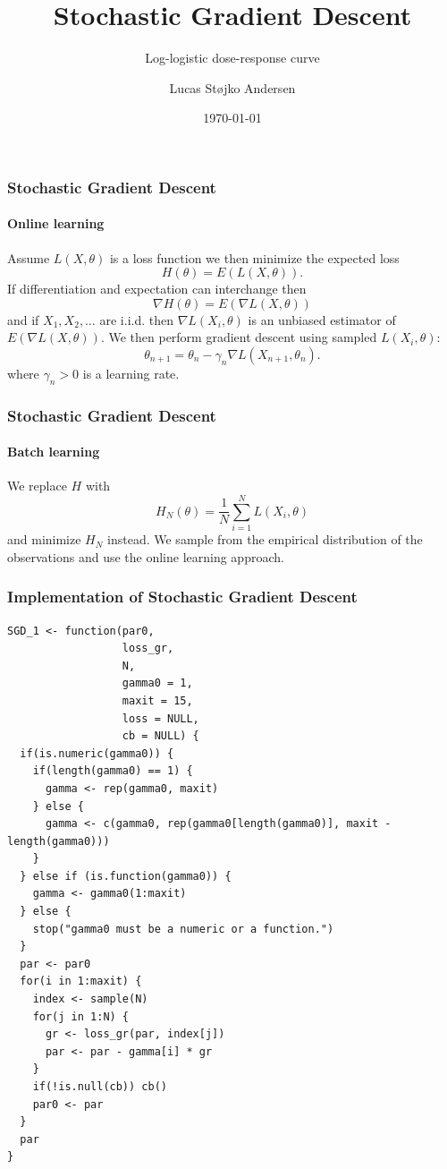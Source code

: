 \documentclass[aspectratio=169]{beamer}
\title{Stochastic Gradient Descent}
\subtitle{Log-logistic  dose-response curve}
\author{Lucas Støjko Andersen}
\institute{University of Copenhagen}
\date{\today}
\begin{document}
\begin{frame}
    \titlepage
\end{frame}
\begin{frame}
    \frametitle{Stochastic Gradient Descent}
    \framesubtitle{Online learning}
    Assume $L(X,\theta)$ is a loss function we then minimize the expected loss
    \begin{equation}
        H(\theta)=E(L(X,\theta)).
    \end{equation}
    If differentiation and expectation can interchange then
    \begin{equation}
        \nabla H(\theta)=E(\nabla L(X,\theta))
    \end{equation}
    and if $X_{1},X_{2},\ldots$ are i.i.d. then $\nabla L(X_{i},\theta)$ is an unbiased estimator of $E(\nabla L(X,\theta))$. We then perform gradient descent using sampled $L(X_{i},\theta)$:
    \begin{equation}
        \theta_{n+1}=\theta_{n} - \gamma_{n}\nabla L(X_{n+1},\theta_{n}).
    \end{equation}
    where $\gamma_{n}>0$ is a learning rate.
\end{frame}
\begin{frame}
    \frametitle{Stochastic Gradient Descent}
    \framesubtitle{Batch learning}
    We replace $H$ with
    \begin{equation}
        H_{N}(\theta)=\frac{1}{N}\sum_{i=1}^{N}L(X_{i},\theta)
    \end{equation}
    and minimize $H_{N}$ instead. We sample from the empirical distribution of the observations and use the online learning approach.
\end{frame}
\begin{frame}[fragile]
    \frametitle{Implementation of Stochastic Gradient Descent}
\begin{verbatim}
SGD_1 <- function(par0,
                  loss_gr,
                  N,
                  gamma0 = 1,
                  maxit = 15,
                  loss = NULL,
                  cb = NULL) {
  if(is.numeric(gamma0)) {
    if(length(gamma0) == 1) {
      gamma <- rep(gamma0, maxit)
    } else {
      gamma <- c(gamma0, rep(gamma0[length(gamma0)], maxit - length(gamma0)))
    }
  } else if (is.function(gamma0)) {
    gamma <- gamma0(1:maxit)
  } else {
    stop("gamma0 must be a numeric or a function.")
  }
  par <- par0
  for(i in 1:maxit) {
    index <- sample(N)
    for(j in 1:N) {
      gr <- loss_gr(par, index[j])
      par <- par - gamma[i] * gr
    }
    if(!is.null(cb)) cb()
    par0 <- par
  }
  par
}
\end{verbatim}
\end{frame}
\end{document}
